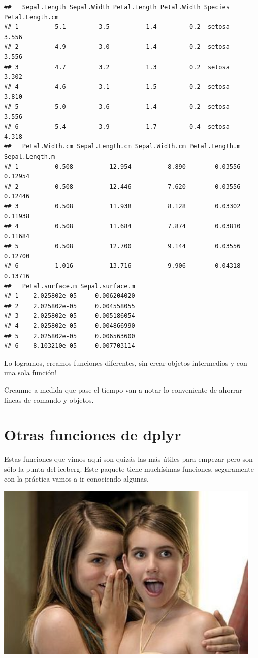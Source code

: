 \documentclass[
]{book}
\begin{document}
\begin{verbatim}
##   Sepal.Length Sepal.Width Petal.Length Petal.Width Species Petal.Length.cm
## 1          5.1         3.5          1.4         0.2  setosa           3.556
## 2          4.9         3.0          1.4         0.2  setosa           3.556
## 3          4.7         3.2          1.3         0.2  setosa           3.302
## 4          4.6         3.1          1.5         0.2  setosa           3.810
## 5          5.0         3.6          1.4         0.2  setosa           3.556
## 6          5.4         3.9          1.7         0.4  setosa           4.318
##   Petal.Width.cm Sepal.Length.cm Sepal.Width.cm Petal.Length.m Sepal.Length.m
## 1          0.508          12.954          8.890        0.03556        0.12954
## 2          0.508          12.446          7.620        0.03556        0.12446
## 3          0.508          11.938          8.128        0.03302        0.11938
## 4          0.508          11.684          7.874        0.03810        0.11684
## 5          0.508          12.700          9.144        0.03556        0.12700
## 6          1.016          13.716          9.906        0.04318        0.13716
##   Petal.surface.m Sepal.surface.m
## 1    2.025802e-05     0.006204020
## 2    2.025802e-05     0.004558055
## 3    2.025802e-05     0.005186054
## 4    2.025802e-05     0.004866990
## 5    2.025802e-05     0.006563600
## 6    8.103210e-05     0.007703114
\end{verbatim}

Lo logramos, creamos funciones diferentes, sin crear objetos intermedios y con una sola función!

Creanme a medida que pase el tiempo van a notar lo conveniente de ahorrar lineas de comando y objetos.

\hypertarget{otras-funciones-de-dplyr}{%
\section{Otras funciones de dplyr}\label{otras-funciones-de-dplyr}}

Estas funciones que vimos aquí son quizás las más útiles para empezar pero son sólo la punta del iceberg.
Este paquete tiene muchísimas funciones, seguramente con la práctica vamos a ir conociendo algunas.

\includegraphics[width=5in]{img/jojo}
\end{document}
